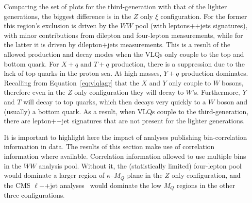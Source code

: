 Comparing the set of plots for the third-generation with that of the lighter generations, the biggest difference is in the $Z$ only $\xi$ configuration. For the former this region's exclusion is driven by the \ATLAS $WW$ pool (with leptons+\MET+jets signatures), with minor contributions from dilepton and four-lepton measurements, while for the latter it is driven by dilepton+jets measurements. This is a result of the allowed production and decay modes when the VLQs only couple to the top and bottom quark. For $X+q$ and $T+q$ production, there is a suppression due to the lack of top quarks in the proton sea. At high masses, $Y+q$ production dominates. Recalling from Equation~\ref{eq:vlqlagr} that the $X$ and $Y$ only couple to $W$ bosons, therefore even in the $Z$ only configuration they will decay to $W$'s. Furthermore, $Y$ and $T$ will decay to top quarks, which then decays very quickly to a $W$ boson and (usually) a bottom quark. As a result, when VLQs couple to the third-generation, there are lepton+\MET+jet signatures that are not present for the lighter generations.

It is important to highlight here the impact of analyses publishing bin-correlation information in data. The results of this section make use of correlation information where available. Correlation information allowed \Contur to use multiple bins in the $WW$ analysis pool. Without it, the (statistically limited) \ATLAS four-lepton pool would dominate a larger region of $\kappa$--$M_Q$ plane in the $Z$ only configuration, and the CMS $\ell$+\MET{}+jet analyses~\cite{Aaboud:2018uzf,Aaboud:2017fha,Aaboud:2018eki,Sirunyan:2018wem,Khachatryan:2016mnb,Sirunyan:2018ptc} would dominate the low $M_Q$ regions in the other three configurations.

